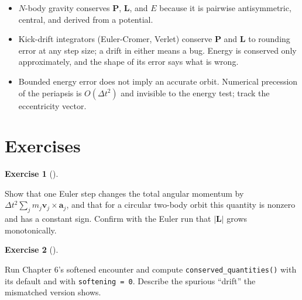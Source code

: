 \documentclass[
  10.5pt,
  letterpaper,
]{scrbook}
\providecommand{\tightlist}{%
  \setlength{\itemsep}{0pt}\setlength{\parskip}{0pt}}
\theoremstyle{definition}
\newtheorem{exercise}{Exercise}[chapter]
\theoremstyle{plain}
\theoremstyle{remark}
\begin{document}
\begin{tcolorbox}[enhanced jigsaw, arc=.35mm, bottomrule=.15mm, bottomtitle=1mm, breakable, colback=white, colbacktitle=quarto-callout-tip-color!10!white, colframe=quarto-callout-tip-color-frame, coltitle=black, left=2mm, leftrule=.75mm, opacityback=0, opacitybacktitle=0.6, rightrule=.15mm, title={Key results}, titlerule=0mm, toprule=.15mm, toptitle=1mm]

\begin{itemize}
\tightlist
\item
  \(N\)-body gravity conserves \(\mathbf{P}\), \(\mathbf{L}\), and \(E\)
  because it is pairwise antisymmetric, central, and derived from a
  potential.
\item
  Kick-drift integrators (Euler-Cromer, Verlet) conserve \(\mathbf{P}\)
  and \(\mathbf{L}\) to rounding error at any step size; a drift in
  either means a bug. Energy is conserved only approximately, and the
  shape of its error says what is wrong.
\item
  Bounded energy error does not imply an accurate orbit. Numerical
  precession of the periapsis is \(O(\Delta t^2)\) and invisible to the
  energy test; track the eccentricity vector.
\end{itemize}

\end{tcolorbox}

\section*{Exercises}\label{exercises-11}


\begin{exercise}[]\protect\hypertarget{exr-ch12-euler-L}{}\label{exr-ch12-euler-L}

Show that one Euler step changes the total angular momentum by
\(\Delta t^2\sum_j m_j\mathbf{v}_j\times\mathbf{a}_j\), and that for a
circular two-body orbit this quantity is nonzero and has a constant
sign. Confirm with the Euler run that \(|\mathbf{L}|\) grows
monotonically.

\end{exercise}

\begin{exercise}[]\protect\hypertarget{exr-ch12-softening}{}\label{exr-ch12-softening}

Run Chapter 6's softened encounter and compute
\texttt{conserved\_quantities()} with its default and with
\texttt{softening\ =\ 0}. Describe the spurious ``drift'' the mismatched
version shows.

\end{exercise}
\end{document}
